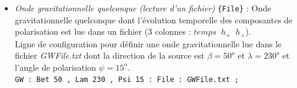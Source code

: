 \documentclass[a4paper,english,12pt]{article}
\begin{document}
\begin{itemize}
\item { \it Onde gravitationnelle quelconque (lecture d'un fichier)} \texttt{\{File\}} : Onde gravitationnelle quelconque dont l'\'evolution temporelle des composantes de polarisation est lue dans un fichier (3 colonnes : $temps \; \; h_+ \; \; h_{\times} $).\\
Ligne de configuration pour d\'efinir une onde gravitationnelle lue dans le fichier {\it GWFile.txt} dont la direction de la source est $\beta = 50^{o}$ et $\lambda = 230^{o}$ et l'angle de polarisation $\psi = 15^{o}$. \\
\hphantom{aaaaa}\texttt{GW : Bet 50 , Lam 230 , Psi 15 : File : GWFile.txt ;}  \\
\end{itemize}

\end{document}

